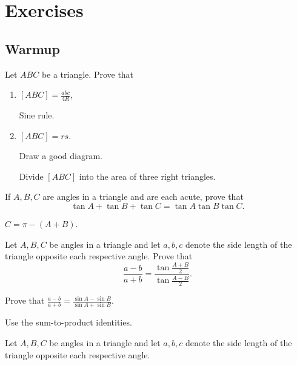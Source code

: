 \documentclass[../jarvis.tex]{subfiles}
\begin{document}
\section{Exercises}
\subsection{Warmup}
\problem Let $ABC$ be a triangle. Prove that 
\begin{enumerate}
    \item $[ABC]=\frac{abc}{4R}$,
    \begin{hints}
        \begin{hint}
            Sine rule.
        \end{hint}
    \end{hints} 
    \item $[ABC]=rs$.
    \begin{hints}
        \begin{hint}
            Draw a good diagram.
        \end{hint}
        \begin{hint}
            Divide $[ABC]$ into the area of three right triangles.
        \end{hint}
    \end{hints}
\end{enumerate}
\problem If $A,B,C$ are angles in a triangle and are each acute, prove that $$\tan{A}+\tan{B}+\tan{C}=\tan{A}\tan{B}\tan{C}.$$
\begin{hints}
    \begin{hint}
        $C=\pi-(A+B)$.
    \end{hint}
\end{hints}
 Let $A,B,C$ be angles in a triangle and let $a,b,c$ denote the side length of the triangle opposite each respective angle. Prove that
$$\frac{a-b}{a+b}=\frac{\tan{\frac{A+B}{2}}}{\tan{\frac{A-B}{2}}}.$$
\begin{hints}
    \begin{hint}
        Prove that $\frac{a-b}{a+b}=\frac{\sin{A}-\sin{B}}{\sin{A}+\sin{B}}.$
    \end{hint}
    \begin{hint}
        Use the sum-to-product identities.
    \end{hint}
\end{hints}
 Let $A,B,C$ be angles in a triangle and let $a,b,c$ denote the side length of the triangle opposite each respective angle.
\end{document}
